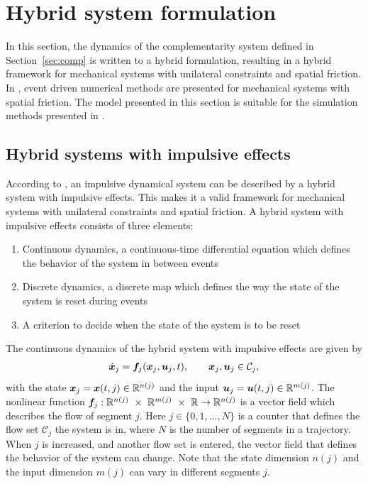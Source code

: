 \documentclass[../DC2017114Bouma.tex]{subfiles}
\begin{document}
\section{Hybrid system formulation}
In this section, the dynamics of the complementarity system defined in Section~\ref{sec:comp} is written to a hybrid formulation, resulting in a hybrid framework for mechanical systems with unilateral constraints and spatial friction. In \cite[p. 222]{Acary2008}, event driven numerical methods are presented for mechanical systems with spatial friction. The model presented in this section is suitable for the simulation methods presented in \cite{Acary2008}.

%
\subsection{Hybrid systems with impulsive effects}\label{sec:2hyb}
According to \cite{Haddad2006}, an impulsive dynamical system can be described by a hybrid system with impulsive effects. This makes it a valid framework for mechanical systems with unilateral constraints and spatial friction. A hybrid system with impulsive effects consists of three elements:
\begin{enumerate}
\item Continuous dynamics, a continuous-time differential equation which defines the behavior of the system in between events
\item Discrete dynamics, a discrete map which defines the way the state of the system is reset during events
\item A criterion to decide when the state of the system is to be reset
\end{enumerate}

The continuous dynamics of the hybrid system with impulsive effects are given by
\begin{align}
\dot{{\boldsymbol{x}}}_j ={\boldsymbol{f}}_j({\boldsymbol{x}}_j,{\boldsymbol{u}}_j,t), \qquad{\boldsymbol{x}}_j,{\boldsymbol{u}}_j\in \mathcal{C}_j,\label{eq:hybimp1}
\end{align}
with the state ${\boldsymbol{x}}_j = {\boldsymbol{x}}(t,j)\in\mathbb{R}^{n(j)}$ and the input ${\boldsymbol{u}}_j = {\boldsymbol{u}}(t,j)\in\mathbb{R}^{m(j)}$. The nonlinear function $\fb_j:\Rbb^{n(j)}\ \times\ \Rbb^{m(j)}\ \times\ \Rbb\rightarrow \Rbb^{n(j)}$ is a vector field which describes the flow of segment $j$. Here $j\in\{0,1,...,N\}$ is a counter that defines the flow set $\mathcal{C}_j$ the system is in, where $N$ is the number of segments in a trajectory. When $j$ is increased, and another flow set is entered, the vector field that defines the behavior of the system can change. Note that the state dimension $n(j)$ and the input dimension $m(j)$ can vary in different segments $j$.
\end{document}
